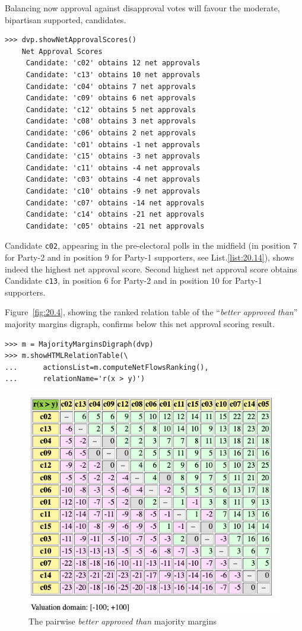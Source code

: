 Balancing now approval against disapproval votes will favour the moderate, bipartisan supported, candidates.
\begin{lstlisting}
>>> dvp.showNetApprovalScores()
    Net Approval Scores
     Candidate: 'c02' obtains 12 net approvals
     Candidate: 'c13' obtains 10 net approvals
     Candidate: 'c04' obtains 7 net approvals
     Candidate: 'c09' obtains 6 net approvals
     Candidate: 'c12' obtains 5 net approvals
     Candidate: 'c08' obtains 3 net approvals
     Candidate: 'c06' obtains 2 net approvals
     Candidate: 'c01' obtains -1 net approvals
     Candidate: 'c15' obtains -3 net approvals
     Candidate: 'c11' obtains -4 net approvals
     Candidate: 'c03' obtains -4 net approvals
     Candidate: 'c10' obtains -9 net approvals
     Candidate: 'c07' obtains -14 net approvals
     Candidate: 'c14' obtains -21 net approvals
     Candidate: 'c05' obtains -21 net approvals
\end{lstlisting}

Candidate \texttt{c02}, appearing in the pre-electoral polls in the midfield (in position 7 for Party-2 and in position 9 for Party-1 supporters, see List.\vref{list:20.14}), shows indeed the highest net approval score. Second highest net approval score obtains Candidate \texttt{c13}, in  position 6 for Party-2 and in position 10 for Party-1 supporters.

Figure~\vref{fig:20.4}, showing the \NetFlows ranked relation table of the ``\emph{better approved than}'' majority margins digraph, confirms below this net approval scoring result.
\begin{lstlisting}
>>> m = MajorityMarginsDigraph(dvp)
>>> m.showHTMLRelationTable(\
...      actionsList=m.computeNetFlowsRanking(),
...      relationName='r(x > y)')
\end{lstlisting}	   
\begin{figure}[ht]
\includegraphics[width=0.9\hsize]{Figures/20-4-majMargDAV.png}
\caption{The pairwise \emph{better approved than} majority margins} 
\label{fig:20.4}       %
\end{figure}

